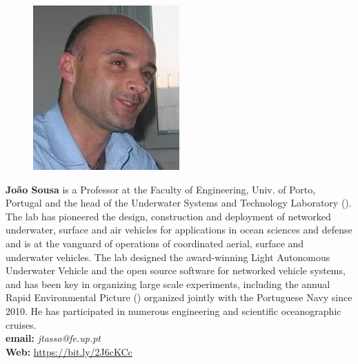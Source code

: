 \documentclass[12pt]{article}
\begin{document}
\parbox{6.25in}{
\begin{figure}
  \centering
  \includegraphics[width=.75\linewidth]{fig/JBS.jpg}
\end{figure}
\textbf{Jo\~ao Sousa} is a Professor at the Faculty of Engineering,
Univ. of Porto, Portugal and the head of the Underwater Systems and
Technology Laboratory (\lse). The lab has pioneered the design,
construction and deployment of networked underwater, surface and air
vehicles for applications in ocean sciences and defense and is at the
vanguard of operations of coordinated aerial, surface and underwater
vehicles. The lab designed the award-winning Light Autonomous
Underwater Vehicle and the \ls open source software for networked
vehicle systems, and has been key in organizing large scale
experiments, including the annual Rapid Environmental Picture (\rpe)
organized jointly with the Portuguese Navy since 2010. He has
participated in numerous engineering and scientific oceanographic
cruises.
\\
\textbf{email: }\emph{jtasso@fe.up.pt}\\
\textbf{Web: }\url{https://bit.ly/2J6cKCc}}
\end{document}
